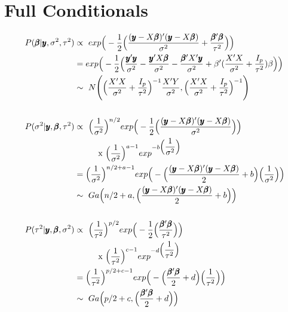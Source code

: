 \documentclass[12pt,letterpaper]{article}
\begin{document}
\section{Full Conditionals}
\begin{align*}
P(\pmb{\beta}|\pmb{y}, \sigma^2, \tau^2) &\propto\
	exp \Big( -\frac{1}{2} \Big( \dfrac{(\pmb{y}-X\pmb{\beta})'
			(\pmb{y}-X\pmb{\beta})} {\sigma^2} + 
			\dfrac{\pmb{\beta}'\pmb{\beta}}{\tau^2}
			\Big) \Big)\\
	&= exp \Big( -\frac{1}{2} \Big( 
		\dfrac{\pmb{y}'\pmb{y}}{\sigma^2}
		- \dfrac{\pmb{y}'X\pmb{\beta}}{\sigma^2}
		- \dfrac{\pmb{\beta}'X'\pmb{y}}{\sigma^2}
		+ \beta' ( \frac{X'X}{\sigma^2} + \frac{I_p}{\tau^2} ) \beta 
		\Big) \Big)\\
	&\sim\ N \Bigg( \Big( \frac{X'X}{\sigma^2} + \frac{I_p}{\tau^2} \Big) ^{-1}
		\frac{X'Y}{\sigma^2} , 
		\Big( \frac{X'X}{\sigma^2} + \frac{I_p}{\tau^2} \Big) ^{-1}
		\Bigg)\\
\vspace{10mm}\\
P(\sigma^2|\pmb{y},\pmb{\beta},\tau^2) &\propto\
	\Big( \dfrac{1}{\sigma^2} \Big) ^{n/2}
	exp \Big( -\frac{1}{2} \Big( \dfrac{(\pmb{y}-X\pmb{\beta})'
			(\pmb{y}-X\pmb{\beta})} {\sigma^2} \Big) \Big)\\
	& \hspace{10mm} \text{x } \Big( \dfrac{1}{\sigma^2} \Big) 
			^{a-1} exp^{-b \Big( \dfrac{1}{\sigma^2} \Big)}\\
	&= \Big( \dfrac{1}{\sigma^2} \Big) ^{n/2 + a -1}
		exp \Big( - \Big( \dfrac{(\pmb{y}-X\pmb{\beta})'
			(\pmb{y}-X\pmb{\beta})} {2} + b \Big)
			\Big( \frac{1}{\sigma^2} \Big) \Big)\\
	&\sim\ Ga \Big( n/2+a, \Big( \dfrac{(\pmb{y}-X\pmb{\beta})'
			(\pmb{y}-X\pmb{\beta})} {2} + b \Big) \Big)\\
\vspace{10mm}\\
P(\tau^2|\pmb{y},\pmb{\beta},\sigma^2) &\propto\
	\Big( \dfrac{1}{\tau^2} \Big) ^{p/2}
	exp \Big( -\frac{1}{2} \Big( \dfrac{\pmb{\beta}'\pmb{\beta}}{\tau^2}
			\Big) \Big)\\
	& \hspace{10mm} \text{x } \Big( \dfrac{1}{\tau^2} \Big) 
			^{c-1} exp^{-d \Big( \dfrac{1}{\tau^2} \Big)}\\
	&= \Big( \dfrac{1}{\tau^2} \Big) ^{p/2 + c -1}
		exp \Big( - \Big( \dfrac{\pmb{\beta}'\pmb{\beta}}{2} + d \Big)
			\Big( \frac{1}{\tau^2} \Big) \Big)\\
	&\sim\ Ga \Big( p/2+c, \Big( \dfrac{\pmb{\beta}'\pmb{\beta}}{2}
		 + d \Big) \Big)\\
\end{align*}
\end{document}
